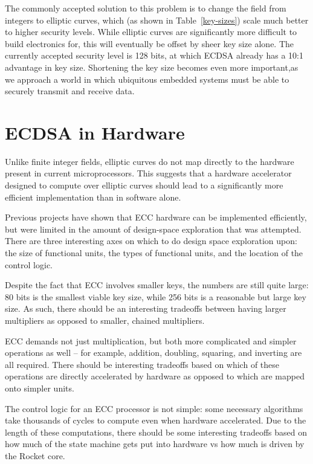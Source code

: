 \documentclass[twocolumn]{article}
\begin{document}
The commonly accepted solution to this problem is to change the field
from integers to elliptic curves, which (as shown in
Table~\ref{key-sizes}) scale much better to higher security levels.
While elliptic curves are significantly more difficult to build
electronics for, this will eventually be offset by sheer key size
alone.  The currently accepted security level is 128 bits, at which
ECDSA already has a 10:1 advantage in key size. Shortening the key 
size becomes even more important,as we approach a world in which 
ubiquitous embedded systems must be able to securely transmit and 
receive data. 

\section{ECDSA in Hardware}

Unlike finite integer fields, elliptic curves do not map directly to
the hardware present in current microprocessors\cite{kss-ecdsa}.  This
suggests that a hardware accelerator designed to compute over elliptic
curves should lead to a significantly more efficient implementation
than in software alone.

Previous projects\cite{nnll-ecdsa_hw} have shown that ECC hardware can
be implemented efficiently, but were limited in the amount of
design-space exploration that was attempted\cite{mmm-hw_ecc}.  There
are three interesting axes on which to do design space exploration
upon: the size of functional units, the types of functional units, and
the location of the control logic.

Despite the fact that ECC involves smaller keys, the numbers are still
quite large: 80 bits is the smallest viable key size, while 256 bits
is a reasonable but large key size.  As such, there should be an
interesting tradeoffs between having larger multipliers as opposed to
smaller, chained multipliers.

ECC demands not just multiplication, but both more complicated and
simpler operations as well -- for example, addition, doubling,
squaring, and inverting are all required.  There should be interesting
tradeoffs based on which of these operations are directly accelerated
by hardware as opposed to which are mapped onto simpler units.

The control logic for an ECC processor is not simple: some necessary
algorithms take thousands of cycles\cite{mmm-hw_ecc} to compute even
when hardware accelerated.  Due to the length of these computations,
there should be some interesting tradeoffs based on how much of the
state machine gets put into hardware vs how much is driven by the
Rocket core.
\end{document}

